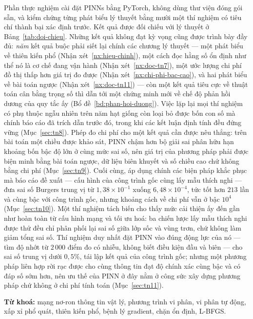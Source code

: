 Phần thực nghiệm cài đặt PINNs bằng PyTorch, không dùng thư viện đóng gói sẵn,
và kiểm chứng từng phát biểu lý thuyết bằng mười một thí nghiệm có tiêu chí thành bại
xác định trước. Kết quả được đối chiếu với lý thuyết ở
Bảng~\ref{tab:doi-chieu}. Những kết quả không đạt kỳ vọng cũng được trình bày
đầy đủ: \emph{năm} kết quả buộc phải siết lại chính các chương lý thuyết --- một
phát biểu về thiên kiến phổ (Nhận xét~\ref{nx:hieu-chinh}), một cách đọc hằng số
ổn định như thể nó là cơ chế đang vận hành (Nhận xét~\ref{nx:doc-tn7}), một
ước lượng chi phí đồ thị thấp hơn giá trị đo được
(Nhận xét~\ref{nx:chi-phi-bac-cao}), và hai phát biểu về bài toán ngược
(Nhận xét~\ref{nx:doc-tn11}) --- còn một kết quả tiêu cực về thuật toán
cân bằng trọng số thì dẫn tới một chứng minh mới về chế độ phản hồi dương của
quy tắc ấy (Bổ đề~\ref{bd:phan-hoi-duong}). Việc lặp lại mọi thí nghiệm có phụ thuộc ngẫu
nhiên trên năm hạt giống còn loại bỏ được bốn con số mà chính báo cáo đã trích
dẫn trước đó, trong khi các kết luận định tính đều đứng vững
(Mục~\ref{sec:tn8}). Phép đo chi phí cho một kết quả cần được nêu
thẳng: trên bài toán một chiều được khảo sát, PINN chậm hơn bộ giải sai phân hữu
hạn khoảng bốn bậc độ lớn ở cùng mức sai số, nên giá trị của phương pháp phải được biện minh
bằng bài toán ngược, dữ liệu biên khuyết và số chiều cao chứ không bằng chi phí
(Mục~\ref{sec:tn9}). Cuối cùng, áp dụng chính các biện pháp khắc phục mà báo cáo
đề xuất --- cấu hình của công trình gốc cùng lấy mẫu thích nghi --- đưa sai số
Burgers trung vị từ $1{,}38\times10^{-1}$ xuống $6{,}48\times10^{-4}$, tức tốt hơn
$213$ lần và cùng bậc với công trình gốc, nhưng khoảng cách về chi phí vẫn ở bậc
$10^{4}$ (Mục~\ref{sec:tn10}). Một thí nghiệm tách biến cho thấy mức cải thiện ấy
đến gần như hoàn toàn từ cấu hình mạng và tối ưu hoá: ba chiến lược lấy mẫu
thích nghi được thử đều chỉ phân phối lại sai số giữa lớp sốc và vùng trơn, chứ
không làm giảm tổng sai số. Thí nghiệm duy nhất đặt PINN vào đúng động lực của nó
--- tìm độ nhớt từ $2\,000$ điểm đo có nhiễu, không biết điều kiện đầu và biên ---
cho sai số trung vị dưới $0{,}5\%$, tái lập kết quả của công trình gốc; nhưng một
phương pháp liên hợp rời rạc được cho cùng thông tin đạt độ chính xác cùng bậc và
có đáp số sớm hơn, nên ưu thế của PINN ở đây nằm ở công sức xây dựng phương pháp
chứ không ở chi phí tính toán (Mục~\ref{sec:tn11}).

\bigskip
\noindent\textbf{Từ khoá:} mạng nơ-ron thông tin vật lý, phương trình vi phân,
vi phân tự động, xấp xỉ phổ quát, thiên kiến phổ, bệnh lý gradient, chặn ổn
định, L-BFGS.

